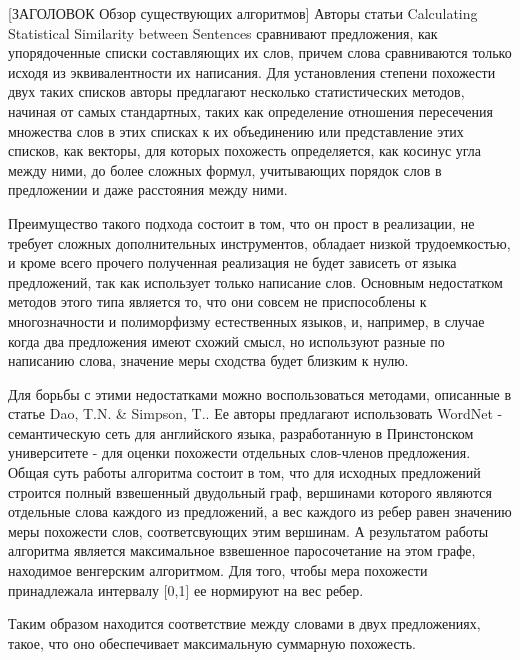 [ЗАГОЛОВОК Обзор существующих алгоритмов]
Авторы статьи Calculating Statistical Similarity between Sentences\cite{statisticalSim} сравнивают предложения, 
как упорядоченные списки составляющих их слов, причем слова сравниваются только исходя из эквивалентности их написания. 
Для установления степени похожести двух таких списков авторы предлагают несколько статистических методов,
начиная от самых стандартных, таких как определение отношения пересечения множества слов в этих списках к их объединению
или представление этих списков, как векторы, для которых похожесть определяется, как косинус угла между ними,
до более сложных формул, учитывающих порядок слов в предложении и даже расстояния между ними.

Преимущество такого подхода состоит в том, что он прост в реализации, не требует
сложных дополнительных инструментов, обладает низкой трудоемкостью, и кроме всего
прочего полученная реализация не будет зависеть от языка предложений, 
так как использует только написание слов.
Основным недостатком методов этого типа является то, что они совсем
не приспособлены к многозначности и полиморфизму естественных языков, и,
например, в случае когда два предложения имеют схожий смысл, но используют разные по написанию слова,
значение меры сходства будет близким к нулю.

Для борьбы с этими недостатками можно воспользоваться методами, описанные в статье Dao, T.N. & Simpson, T.\cite{wordnetSim}.
Ее авторы предлагают использовать WordNet\cite{wordnet} - семантическую сеть для английского языка, 
разработанную в Принстонском университете - для оценки похожести отдельных слов-членов предложения.
Общая суть работы алгоритма состоит в том, что для исходных предложений
строится полный взвешенный двудольный граф, вершинами которого являются отдельные
слова каждого из предложений, а вес каждого из ребер равен значению меры похожести слов,
соответсвующих этим вершинам. А результатом работы алгоритма является максимальное
взвешенное паросочетание на этом графе, находимое венгерским алгоритмом.
Для того, чтобы мера похожести принадлежала интервалу [0,1] ее нормируют на вес ребер.

Таким образом находится соответствие между словами в двух предложениях, такое,
что оно обеспечивает максимальную суммарную похожесть.





